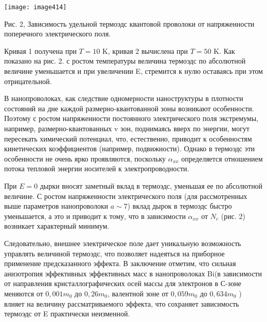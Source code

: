 \noindent \texttt{[image: image414]}
 
\noindent Рис. 2, Зависимость удельной термоэдс квантовой проволоки от напряженности поперечного электрического поля.
 
Кривая 1 получена при $T=10 \text{ K}$, кривая 2 вычислена при $T=50 \text{ K}$. Как показано на рис. 2. с ростом температуры величина термоэдс по абсолютной величине уменьшается и при увеличении E, стремится к нулю оставаясь при этом отрицательной.
 
В нанопроволоках, как следствие одномерности наноструктуры в плотности состояний на дне каждой размерно-квантованной зоны возникают особенности. Поэтому с ростом напряженности постоянного электрического поля экстремумы, например, размерно-квантованных v зон, поднимаясь вверх по энергии, могут пересекать химический потенциал, что, естественно, приводит к особенностям кинетических коэффициентов (например, подвижности). Однако в термоэдс эти особенности не очень ярко проявляются, поскольку $\alpha _{xx} $ определяется отношением потока тепловой энергии носителей к электропроводности.
 
При $E=0$ дырки вносят заметный вклад в термоэдс, уменьшая ее по абсолютной величине. С ростом напряженности электрического поля (для рассмотренных выше параметров нанопроволоки $a\sim 7$) вклад дырок в термоэдс быстро уменьшается, а это и приводит к тому, что в зависимости $\alpha _{xx} $ от $N_{c} $ (рис. 2) возникает характерный минимум.
 
Следовательно, внешнее электрическое поле дает уникальную возможность управлять величиной термоэдс, что позволяет надеяться  на приборное применение предсказанного эффекта. В заключение отметим, что сильная анизотропия эффективных эффективных масс в нанопроволоках Bi(в зависимости от направления кристаллографических осей массы для электронов в С-зоне меняются от $0,001m_{0} $ до $0,26m_{0} $, валентной зоне от $0,059m_{0} $ до $0,634m_{0} $ \cite{Levin2009a}) влияет на величину рассматриваемого эффекта, что сохраняет зависимость термоэдс от E практически неизменной.
